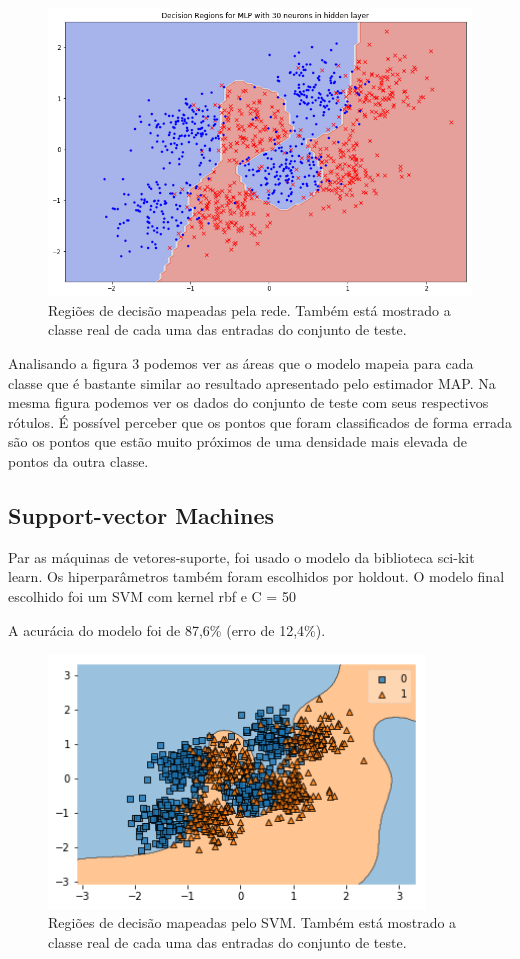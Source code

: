 \documentclass[a4paper, 12pt]{article}
\begin{document}
\begin{figure}[H]
    \centering
  \includegraphics[width=15cm]{images/mlp_regions_h_30.png}
    \caption{Regiões de decisão mapeadas pela rede. Também está mostrado a classe real de cada uma das entradas do conjunto de teste.}
\end{figure}

Analisando a figura 3 podemos ver as áreas que o modelo mapeia para cada classe que é bastante similar ao resultado apresentado pelo estimador MAP. Na mesma figura podemos ver os dados do conjunto de teste com seus respectivos rótulos. É possível perceber que os pontos que foram classificados de forma errada são os pontos que estão muito próximos de uma densidade mais elevada de pontos da outra classe.

\subsection*{Support-vector Machines}

Par as máquinas de vetores-suporte, foi usado o modelo da biblioteca sci-kit learn. Os hiperparâmetros também foram escolhidos por holdout.
O modelo final escolhido foi um SVM com kernel rbf e C = 50

A acurácia do modelo foi de 87,6\% (erro de 12,4\%).

\begin{figure}[H]
    \centering
  \includegraphics[width=10cm]{images/test_regions_svm_50_rbf.png}
    \caption{Regiões de decisão mapeadas pelo SVM. Também está mostrado a classe real de cada uma das entradas do conjunto de teste.}
\end{figure}
\end{document}
